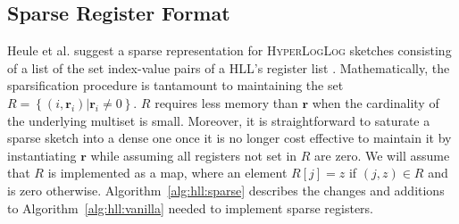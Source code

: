 \documentclass[10]{article}
\newcommand{\algoname}[1]{\textnormal{\textsc{#1}}}
\begin{document}
\subsection{Sparse Register Format}
 \label{DS:sec:HLL:sparse}


Heule et al. suggest a sparse representation for \algoname{HyperLogLog} sketches consisting of a list of the set index-value pairs of a \algoname{HLL}'s register list \cite{heule2013hyperloglog}.
Mathematically, the sparsification procedure is tantamount to maintaining the set $R = \left \{(i, \mathbf{r}_i) | \mathbf{r}_i \neq 0 \right \}$.
$R$ requires less memory than $\mathbf{r}$ when the cardinality of the underlying multiset is small. 
Moreover, it is straightforward to saturate a sparse sketch into a dense one once it is no longer cost effective to maintain it by instantiating $\mathbf{r}$ while assuming all registers not set in $R$ are zero. 
We will assume that $R$ is implemented as a map, where an element $R[j] = z$ if $(j, z) \in R$ and is zero otherwise.
Algorithm~\ref{alg:hll:sparse} describes the changes and additions to Algorithm~\ref{alg:hll:vanilla} needed to implement sparse registers.
\end{document}
